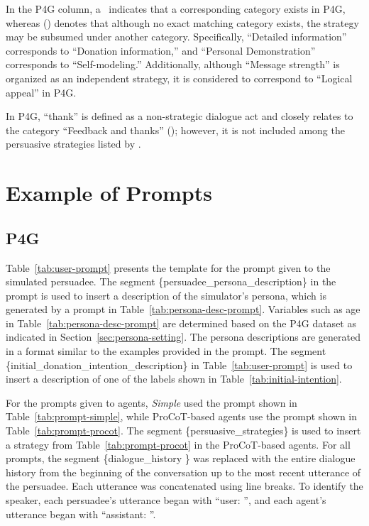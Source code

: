 \documentclass[11pt]{article}
\begin{document}
In the P4G column, a \checkmark \ indicates that a corresponding category exists in P4G, whereas (\checkmark) denotes that although no exact matching category exists, the strategy may be subsumed under another category. Specifically, ``Detailed information'' corresponds to ``Donation information,'' and ``Personal Demonstration'' corresponds to ``Self-modeling.'' Additionally, although ``Message strength'' is organized as an independent strategy, it is considered to correspond to ``Logical appeal'' in P4G.

In P4G, ``thank'' is defined as a non-strategic dialogue act and closely relates to the category ``Feedback and thanks'' (\textasteriskcentered); however, it is not included among the persuasive strategies listed by \citet{zhang-etal-2024-strength}.

\section{Example of Prompts}
\label{sec:prompt}
\subsection{P4G}
% 
% 
% 
% 
% 
% 
% 
% 
% 

Table~\ref{tab:user-prompt} presents the template for the prompt given to the simulated persuadee. 
The segment \{persuadee\_persona\_description\} in the prompt is used to insert a description of the simulator's persona, which is generated by a prompt in Table~\ref{tab:persona-desc-prompt}. 
Variables such as age in Table~\ref{tab:persona-desc-prompt} are determined based on the P4G dataset as indicated in Section~\ref{sec:persona-setting}. 
The persona descriptions are generated in a format similar to the examples provided in the prompt. 
The segment \{initial\_donation\_intention\_description\} in Table~\ref{tab:user-prompt} is used to insert a description of one of the labels shown in Table~\ref{tab:initial-intention}.


For the prompts given to agents, \textit{Simple} used the prompt shown in Table~\ref{tab:prompt-simple}, while ProCoT-based agents use the prompt shown in Table~\ref{tab:prompt-procot}. 
The segment \{persuasive\_strategies\} is used to insert a strategy from Table~\ref{tab:prompt-procot} in the ProCoT-based agents.
For all prompts, the segment \{dialogue\_history \} was replaced with the entire dialogue history from the beginning of the conversation up to the most recent utterance of the persuadee. 
Each utterance was concatenated using line breaks.
To identify the speaker, each persuadee's utterance began with ``user: '', and each agent's utterance began with ``assistant: ''.
\end{document}
